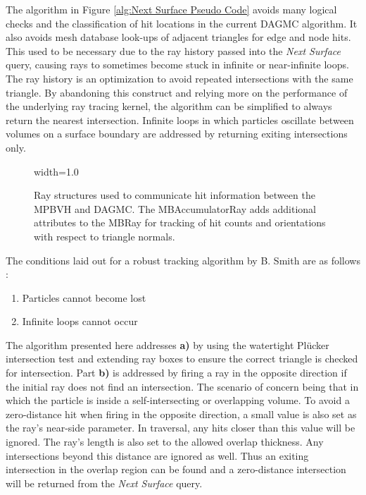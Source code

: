 The algorithm in Figure \ref{alg:Next Surface Pseudo Code} avoids many logical
checks and the classification of hit locations in the current DAGMC algorithm. It
also avoids mesh database look-ups of adjacent triangles for edge and node
hits. This used to be necessary due to the ray history passed into the
\textit{Next Surface} query, causing rays to sometimes become stuck in infinite
or near-infinite loops. The ray history is an optimization to avoid repeated
intersections with the same triangle. By abandoning this construct and relying
more on the performance of the underlying ray tracing kernel, the algorithm
can be simplified to always return the nearest intersection. Infinite loops in
which particles oscillate between volumes on a surface boundary are addressed by
returning exiting intersections only.

\begin{figure}[H]
  \centering
  {width=1.0\textwidth}
  \caption[Extended ray structures for particle tracking.]{Ray structures used to communicate hit information between the MPBVH
    and DAGMC. The MBAccumulatorRay adds additional attributes to the MBRay for
    tracking of hit counts and orientations with respect to triangle normals.}
  \label{fig:mpbvh_ray_structures}  
\end{figure}

The conditions laid out for a robust tracking
algorithm by B. Smith are as follows \cite{Smith_2011}:

\begin{enumerate}[{a)}]
  \bfseries
  \item \normalfont Particles cannot become lost
  \bfseries
\item \normalfont Infinite loops cannot occur
  \normalfont
\end{enumerate}

The algorithm presented here addresses \textbf{a)} by using the watertight
Pl\"{u}cker intersection test and extending ray boxes to ensure the correct
triangle is checked for intersection. Part \textbf{b)} is addressed by firing a
ray in the opposite direction if the initial ray does not find an
intersection. The scenario of concern being that in which the particle is inside a
self-intersecting or overlapping volume. To avoid a zero-distance hit when
firing in the opposite direction, a small value is also set as the ray's
near-side parameter. In traversal, any hits closer than this value will be
ignored. The ray's length is also set to the allowed overlap thickness. Any
intersections beyond this distance are ignored as well. Thus an exiting
intersection in the overlap region can be found and a zero-distance intersection
will be returned from the \textit{Next Surface} query.

